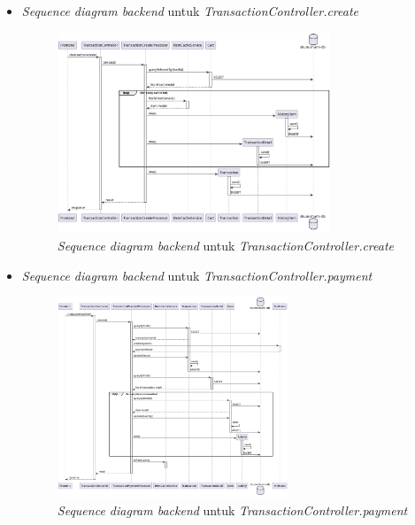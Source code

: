 \documentclass[a4paper]{article}
\begin{document}
\begin{enumerate}
\begin{enumerate}
\begin{itemize}
            \newpage
            \item \textit{Sequence diagram backend} untuk \textit{TransactionController.create}
            \begin{figure}[h]
                \centering
                \includegraphics*[height=6cm]{diagram/sequence diagram/BE/transaction controller/create/create.png}
                \caption{\textit{Sequence diagram backend} untuk \textit{TransactionController.create}}
            \end{figure}

            \item \textit{Sequence diagram backend} untuk \textit{TransactionController.payment}
            \begin{figure}[h]
                \centering
                \includegraphics*[height=6cm]{diagram/sequence diagram/BE/transaction controller/payment/payment.png}
                \caption{\textit{Sequence diagram backend} untuk \textit{TransactionController.payment}}
            \end{figure}


\end{itemize}
\end{enumerate}
\end{enumerate}
\end{document}
